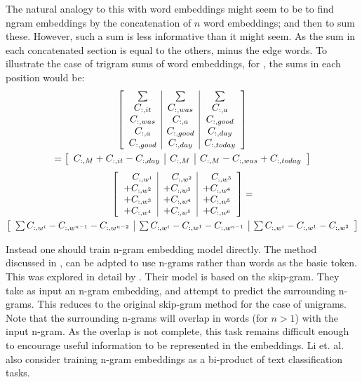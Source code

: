 \documentclass[12pt,parskip]{komatufte}
\begin{document}
The natural analogy to this with word embeddings might seem to be to find ngram embeddings by the concatenation of $n$ word embeddings; and then to sum these.
However, such a sum is less informative than it might seem.
As the sum in each concatenated section is equal to the others, minus the edge words. To illustrate the case of trigram sums of word embeddings, for ,
the sums in each position would be:
\begin{multline}
\left[\begin{array}{c|c|c}
	\sum & \sum & \sum\\
	\i C_{it} & \i C_{was} & \i C_{a}\\
	\i C_{was} & \i C_{a} & \i C_{good}\\
	\i C_{a} & \i C_{good} & \i C_{day}\\
	\i C_{good} & \i C_{day} & \i C_{today}
\end{array}\right]\\
=\left[\begin{array}{c|c|c}
	\i C_{M}+\i C_{it}-\i C_{day} & \i C_{M} & \i C_{M}-\i C_{was}+\i C_{today}\end{array}\right]
\end{multline}
\begin{multline}
\left[\begin{array}{c|c|c}
	\quad \i C_{\n w_{1}} & \quad \i C_{\n w_{2}} & \quad \i C_{\n w_{3}}\\
	+\i C_{\n w_{2}} & +\i C_{\n w_{3}} & +\i C_{\n w_{4}}\\
	+\i C_{\n w_{3}} & +\i C_{\n w_{4}} & +\i C_{\n w_{5}}\\
	+\i C_{\n w_{4}} & +\i C_{\n w_{5}} & +\i C_{\n w_{6}}
\end{array}\right]=\\
\left[\begin{array}{c|c|c}
	\sum \i C_{\n w_{i}}-\i C_{\n w_{n-1}}-\i C_{\n w_{n-2}} & \sum \i C_{\n w_{i}}-\i C_{\n w_{1}}-\i C_{\n w_{n-1}} & \sum \i C_{\n w_{i}}-\i C_{\n w_{1}}-\i C_{\n w_{2}}\end{array}\right]
\end{multline}


Instead one should train n-gram embedding model directly.
The method discussed in , can be adpted to use n-grams rather than words as the basic token.
This was explored in detail by .
Their model is based on the skip-gram.
They take as input an n-gram embedding, and attempt to predict the surrounding n-grams.
This reduces to the original skip-gram method for the case of unigrams.
Note that the surrounding n-grams will overlap in words (for $n>1$)  with the input n-gram.
As the overlap is not complete, this task remains difficult enough to encourage useful information to be represented in the embeddings.
Li et. al. also consider training n-gram embeddings as a bi-product of text classification tasks.
\end{document}

